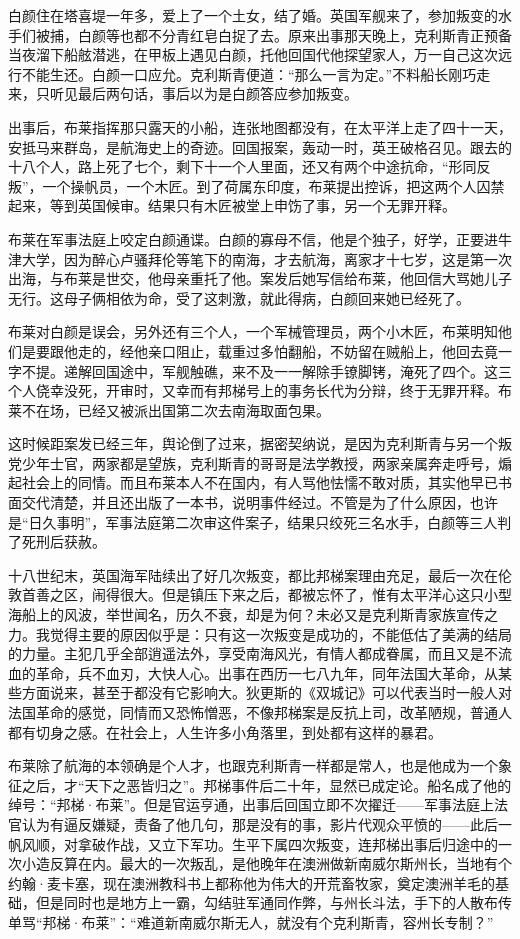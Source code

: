 \par 白颜住在塔喜堤一年多，爱上了一个土女，结了婚。英国军舰来了，参加叛变的水手们被捕，白颜等也都不分青红皂白捉了去。原来出事那天晚上，克利斯青正预备当夜溜下船舷潜逃，在甲板上遇见白颜，托他回国代他探望家人，万一自己这次远行不能生还。白颜一口应允。克利斯青便道：“那么一言为定。”不料船长刚巧走来，只听见最后两句话，事后以为是白颜答应参加叛变。
\par 出事后，布莱指挥那只露天的小船，连张地图都没有，在太平洋上走了四十一天，安抵马来群岛，是航海史上的奇迹。回国报案，轰动一时，英王破格召见。跟去的十八个人，路上死了七个，剩下十一个人里面，还又有两个中途抗命，“形同反叛”，一个操帆员，一个木匠。到了荷属东印度，布莱提出控诉，把这两个人囚禁起来，等到英国候审。结果只有木匠被堂上申饬了事，另一个无罪开释。
\par 布莱在军事法庭上咬定白颜通谍。白颜的寡母不信，他是个独子，好学，正要进牛津大学，因为醉心卢骚拜伦等笔下的南海，才去航海，离家才十七岁，这是第一次出海，与布莱是世交，他母亲重托了他。案发后她写信给布莱，他回信大骂她儿子无行。这母子俩相依为命，受了这刺激，就此得病，白颜回来她已经死了。
\par 布莱对白颜是误会，另外还有三个人，一个军械管理员，两个小木匠，布莱明知他们是要跟他走的，经他亲口阻止，载重过多怕翻船，不妨留在贼船上，他回去竟一字不提。递解回国途中，军舰触礁，来不及一一解除手镣脚铐，淹死了四个。这三个人侥幸没死，开审时，又幸而有邦梯号上的事务长代为分辩，终于无罪开释。布莱不在场，已经又被派出国第二次去南海取面包果。
\par 这时候距案发已经三年，舆论倒了过来，据密契纳说，是因为克利斯青与另一个叛党少年士官，两家都是望族，克利斯青的哥哥是法学教授，两家亲属奔走呼号，煽起社会上的同情。而且布莱本人不在国内，有人骂他怯懦不敢对质，其实他早已书面交代清楚，并且还出版了一本书，说明事件经过。不管是为了什么原因，也许是“日久事明”，军事法庭第二次审这件案子，结果只绞死三名水手，白颜等三人判了死刑后获赦。
\par 十八世纪末，英国海军陆续出了好几次叛变，都比邦梯案理由充足，最后一次在伦敦首善之区，闹得很大。但是镇压下来之后，都被忘怀了，惟有太平洋心这只小型海船上的风波，举世闻名，历久不衰，却是为何？未必又是克利斯青家族宣传之力。我觉得主要的原因似乎是：只有这一次叛变是成功的，不能低估了美满的结局的力量。主犯几乎全部逍遥法外，享受南海风光，有情人都成眷属，而且又是不流血的革命，兵不血刃，大快人心。出事在西历一七八九年，同年法国大革命，从某些方面说来，甚至于都没有它影响大。狄更斯的《双城记》可以代表当时一般人对法国革命的感觉，同情而又恐怖憎恶，不像邦梯案是反抗上司，改革陋规，普通人都有切身之感。在社会上，人生许多小角落里，到处都有这样的暴君。
\par 布莱除了航海的本领确是个人才，也跟克利斯青一样都是常人，也是他成为一个象征之后，才“天下之恶皆归之”。邦梯事件后二十年，显然已成定论。船名成了他的绰号：“邦梯·布莱”。但是官运亨通，出事后回国立即不次擢迁——军事法庭上法官认为有逼反嫌疑，责备了他几句，那是没有的事，影片代观众平愤的——此后一帆风顺，对拿破作战，又立下军功。生平下属四次叛变，连邦梯出事后归途中的一次小造反算在内。最大的一次叛乱，是他晚年在澳洲做新南威尔斯州长，当地有个约翰·麦卡塞，现在澳洲教科书上都称他为伟大的开荒畜牧家，奠定澳洲羊毛的基础，但是同时也是地方上一霸，勾结驻军通同作弊，与州长斗法，手下的人散布传单骂“邦梯·布莱”：“难道新南威尔斯无人，就没有个克利斯青，容州长专制？”
